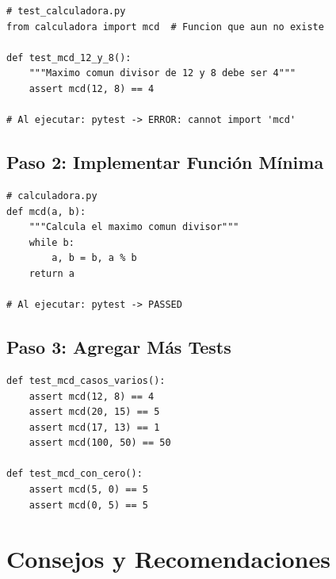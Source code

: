 \documentclass[12pt,a4paper]{article}
\begin{document}
\begin{lstlisting}[caption=Test primero (falla porque funcion no existe)]
# test_calculadora.py
from calculadora import mcd  # Funcion que aun no existe

def test_mcd_12_y_8():
    """Maximo comun divisor de 12 y 8 debe ser 4"""
    assert mcd(12, 8) == 4

# Al ejecutar: pytest -> ERROR: cannot import 'mcd'
\end{lstlisting}

\subsection{Paso 2: Implementar Función Mínima}

\begin{lstlisting}[caption=Implementacion minima]
# calculadora.py
def mcd(a, b):
    """Calcula el maximo comun divisor"""
    while b:
        a, b = b, a % b
    return a

# Al ejecutar: pytest -> PASSED
\end{lstlisting}

\subsection{Paso 3: Agregar Más Tests}

\begin{lstlisting}[caption=Mas tests para cubrir casos]
def test_mcd_casos_varios():
    assert mcd(12, 8) == 4
    assert mcd(20, 15) == 5
    assert mcd(17, 13) == 1
    assert mcd(100, 50) == 50

def test_mcd_con_cero():
    assert mcd(5, 0) == 5
    assert mcd(0, 5) == 5
\end{lstlisting}

\section{Consejos y Recomendaciones}
\end{document}
